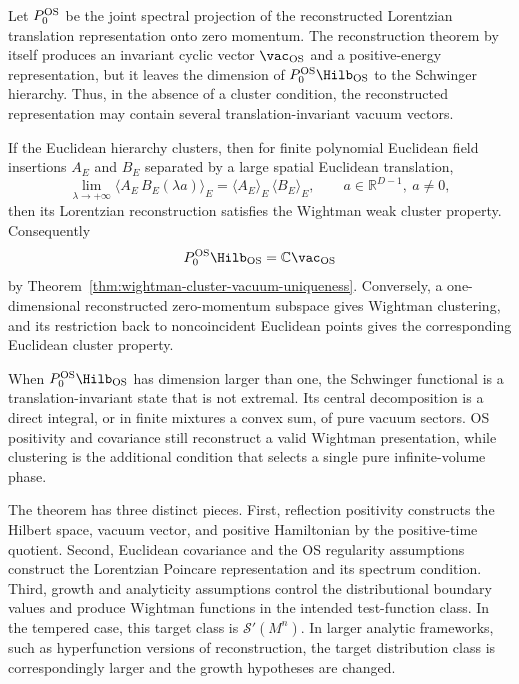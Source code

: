 \begin{corollary}
\label{cor:os-reconstruction-vacuum-sector}
Let \(P_0^{\rm OS}\) be the joint spectral projection of the reconstructed
Lorentzian translation representation onto zero momentum.  The reconstruction
theorem by itself produces an invariant cyclic vector \(\vac_{\rm OS}\) and a
positive-energy representation, but it leaves the dimension of
\(P_0^{\rm OS}\Hilb_{\rm OS}\) to the Schwinger hierarchy.  Thus, in the
absence of a cluster condition, the reconstructed representation may contain
several translation-invariant vacuum vectors.

If the Euclidean hierarchy clusters, then for finite polynomial Euclidean
field insertions \(A_E\) and \(B_E\) separated by a large spatial Euclidean
translation,
\[
  \lim_{\lambda\to+\infty}
  \langle A_E\,B_E(\lambda a)\rangle_E
  =
  \langle A_E\rangle_E\,\langle B_E\rangle_E,
  \qquad a\in\mathbb R^{D-1},\ a\ne0,
\]
then its Lorentzian reconstruction satisfies the Wightman weak cluster
property.  Consequently
\[
  P_0^{\rm OS}\Hilb_{\rm OS}=\mathbb C\vac_{\rm OS}
\]
by Theorem~\ref{thm:wightman-cluster-vacuum-uniqueness}.  Conversely, a
one-dimensional reconstructed zero-momentum subspace gives Wightman
clustering, and its restriction back to noncoincident Euclidean points gives
the corresponding Euclidean cluster property.
\end{corollary}

When \(P_0^{\rm OS}\Hilb_{\rm OS}\) has dimension larger than one, the
Schwinger functional is a translation-invariant state that is not extremal. Its
central decomposition is a direct integral, or in finite mixtures a convex
sum, of pure vacuum sectors.  OS positivity and covariance still reconstruct a
valid Wightman presentation, while clustering is the additional condition that
selects a single pure infinite-volume phase.

The theorem has three distinct pieces.  First, reflection positivity constructs
the Hilbert space, vacuum vector, and positive Hamiltonian by the positive-time
quotient.  Second, Euclidean covariance and the OS regularity assumptions
construct the Lorentzian Poincare representation and its spectrum condition.
Third, growth and analyticity assumptions control the distributional boundary
values and produce Wightman functions in the intended test-function class.  In
the tempered case, this target class is \(\mathcal S'(M^n)\).  In larger
analytic frameworks, such as hyperfunction versions of reconstruction, the
target distribution class is correspondingly larger and the growth hypotheses
are changed.

